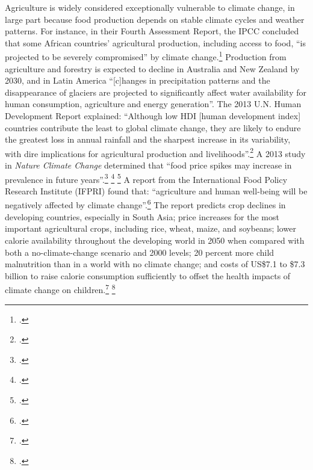 \documentclass[10pt]{article}
\begin{document}
Agriculture is widely considered exceptionally vulnerable to climate change, in large part because food production depends on stable climate cycles and weather patterns.
For instance, in their Fourth Assessment Report, the IPCC concluded that some African countries' agricultural production, including access to food, ``is projected to be severely compromised'' by climate change.\footcite[][See: Synthesis report, Table SPM.2. Examples of some projected regional impacts. \url{https://www.ipcc.ch/publications_and_data/ar4/syr/en/spms3.html}]{IPCC2007}
Production from agriculture and forestry is expected to decline in Australia and New Zealand by 2030, and in Latin America ``[c]hanges in precipitation patterns and the disappearance of glaciers are projected to significantly affect water availability for human consumption, agriculture and energy generation''.
The 2013 U.N. Human Development Report explained: ``Although low HDI [human development index] countries contribute the least to global climate change, they are likely to endure the greatest loss in annual rainfall and the sharpest increase in its variability, with dire implications for agricultural production and livelihoods''.\footcite[][p. 6]{UNHumanDev2013}
A 2013 study in \emph{Nature Climate Change} determined that ``food price spikes may increase in prevalence in future years''.\footcite[][p. 1]{Iizumi2013} \footcite[See also: ][]{IPCCExtremeEvents} \footcite[][p. 271--289]{Funk2009}
A report from the International Food Policy Research Institute (IFPRI) found that: ``agriculture and human well-being will 
be negatively affected by climate change''.\footcite[][p. vii]{IFPRIAgri}
The report predicts crop declines in developing countries, especially in South Asia; price increases for the most important agricultural crops, including rice, wheat, maize, and soybeans; lower calorie availability throughout the developing world in 2050 when compared with both a no-climate-change scenario and 2000 levels; 20 percent more child malnutrition than in a world with no climate change; and costs of US\$7.1 to \$7.3 billion to raise calorie consumption sufficiently to offset the health impacts of climate change on children.\footcite[][p. vii]{IFPRIAgri} \footcite[See also: ][]{Wheeler2013}
\end{document}
